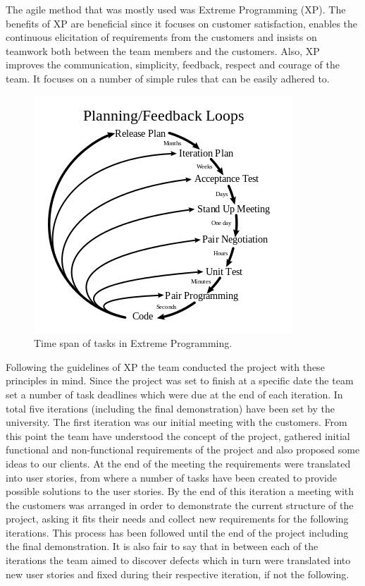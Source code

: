 \documentclass{l3proj}
\begin{document}
The agile method that was mostly used was Extreme Programming (XP). The benefits of XP are beneficial since it focuses on
customer satisfaction, enables the continuous elicitation of requirements from the customers and insists on teamwork
both between the team members and the customers. Also, XP improves the communication, simplicity, feedback, respect and
courage of the team. It focuses on a number of simple rules that can be easily adhered to.

\begin{figure}
\includegraphics[width=1.1\linewidth]{figures/Extreme_Programming}
\caption{Time span of tasks in Extreme Programming.}
\label{fig:extreme-programming}
\end{figure}

Following the guidelines of XP the team conducted the project with these principles in mind. Since the project was set to finish at a specific date
the team set a number of task deadlines which were due at the end of each iteration. In total five iterations
(including the final demonstration) have been set by the university. The first iteration was our initial meeting with
the customers. From this point the team have understood the concept of the project, gathered initial functional and non-functional
requirements of the project and also proposed some ideas to our clients. At the end of the meeting the requirements were
translated into user stories, from where a number of tasks have been created to provide possible solutions to the user stories.
By the end of this iteration a meeting with the customers was arranged in order to demonstrate the current structure of the
project, asking it fits their needs and collect new requirements for the following iterations. This process has been followed
until the end of the project including the final demonstration. It is also fair to say that in between each of the iterations the team
aimed to discover defects which in turn were translated into new user stories and fixed during their respective iteration,
if not the following.
\end{document}

